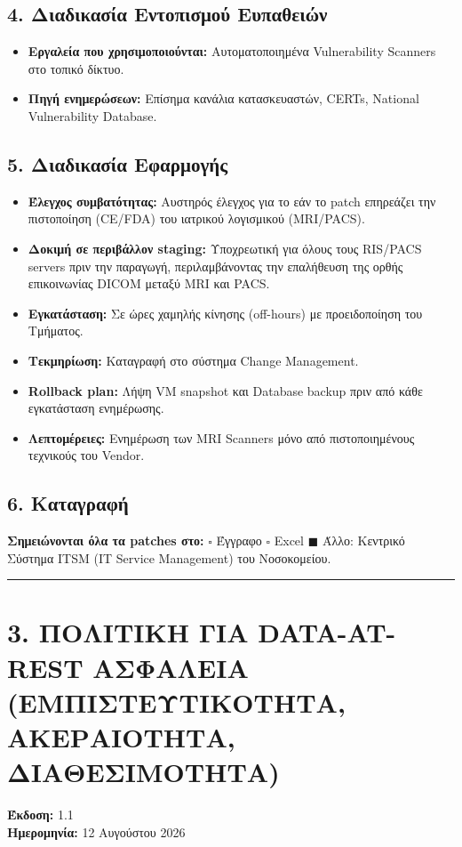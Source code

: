 \documentclass[11pt,a4paper]{article}
\begin{document}
\subsection*{4. Διαδικασία Εντοπισμού Ευπαθειών}
\begin{itemize}
    \item \textbf{Εργαλεία που χρησιμοποιούνται:} Αυτοματοποιημένα Vulnerability Scanners στο τοπικό δίκτυο.
    \item \textbf{Πηγή ενημερώσεων:} Επίσημα κανάλια κατασκευαστών, CERTs, National Vulnerability Database.
\end{itemize}

\subsection*{5. Διαδικασία Εφαρμογής}
\begin{itemize}
    \item \textbf{Έλεγχος συμβατότητας:} Αυστηρός έλεγχος για το εάν το patch επηρεάζει την πιστοποίηση (CE/FDA) του ιατρικού λογισμικού (MRI/PACS).
    \item \textbf{Δοκιμή σε περιβάλλον staging:} Υποχρεωτική για όλους τους RIS/PACS servers πριν την παραγωγή, περιλαμβάνοντας την επαλήθευση της ορθής επικοινωνίας DICOM μεταξύ MRI και PACS.
    \item \textbf{Εγκατάσταση:} Σε ώρες χαμηλής κίνησης (off-hours) με προειδοποίηση του Τμήματος.
    \item \textbf{Τεκμηρίωση:} Καταγραφή στο σύστημα Change Management.
    \item \textbf{Rollback plan:} Λήψη VM snapshot και Database backup πριν από κάθε εγκατάσταση ενημέρωσης.
    \item \textbf{Λεπτομέρειες:} Ενημέρωση των MRI Scanners μόνο από πιστοποιημένους τεχνικούς του Vendor.
\end{itemize}

\subsection*{6. Καταγραφή}
\textbf{Σημειώνονται όλα τα patches στο:} $\square$ Έγγραφο \quad $\square$ Excel \quad $\blacksquare$ Άλλο: Κεντρικό Σύστημα ITSM (IT Service Management) του Νοσοκομείου.

\vspace{1cm}
\hrule
\vspace{1cm}

\section*{3. ΠΟΛΙΤΙΚΗ ΓΙΑ DATA-AT-REST ΑΣΦΑΛΕΙΑ (ΕΜΠΙΣΤΕΥΤΙΚΟΤΗΤΑ, ΑΚΕΡΑΙΟΤΗΤΑ, ΔΙΑΘΕΣΙΜΟΤΗΤΑ)}
\textbf{Έκδοση:} 1.1\\
\textbf{Ημερομηνία:} 12 Αυγούστου 2026
\end{document}
